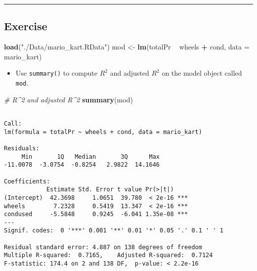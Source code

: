 \documentclass[]{book}
\newenvironment{Shaded}{\begin{snugshade}}{\end{snugshade}}
\newcommand{\KeywordTok}[1]{\textcolor[rgb]{0.13,0.29,0.53}{\textbf{#1}}}
\newcommand{\DataTypeTok}[1]{\textcolor[rgb]{0.13,0.29,0.53}{#1}}
\newcommand{\StringTok}[1]{\textcolor[rgb]{0.31,0.60,0.02}{#1}}
\newcommand{\CommentTok}[1]{\textcolor[rgb]{0.56,0.35,0.01}{\textit{#1}}}
\newcommand{\OperatorTok}[1]{\textcolor[rgb]{0.81,0.36,0.00}{\textbf{#1}}}
\newcommand{\NormalTok}[1]{#1}
\providecommand{\tightlist}{%
  \setlength{\itemsep}{0pt}\setlength{\parskip}{0pt}}
\begin{document}
\begin{center}\rule{0.5\linewidth}{\linethickness}\end{center}

\subsection*{Exercise}\label{exercise-4}

\begin{Shaded}
\begin{Highlighting}[]
\KeywordTok{load}\NormalTok{(}\StringTok{"./Data/mario_kart.RData"}\NormalTok{)}
\NormalTok{mod <-}\StringTok{ }\KeywordTok{lm}\NormalTok{(totalPr }\OperatorTok{~}\StringTok{ }\NormalTok{wheels }\OperatorTok{+}\StringTok{ }\NormalTok{cond, }\DataTypeTok{data =}\NormalTok{ mario_kart)}
\end{Highlighting}
\end{Shaded}

\begin{itemize}
\tightlist
\item
  Use \texttt{summary()} to compute \(R^2\) and adjusted \(R^2\) on the
  model object called \texttt{mod}.
\end{itemize}

\begin{Shaded}
\begin{Highlighting}[]
\CommentTok{# R^2 and adjusted R^2}
\KeywordTok{summary}\NormalTok{(mod)}
\end{Highlighting}
\end{Shaded}

\begin{verbatim}

Call:
lm(formula = totalPr ~ wheels + cond, data = mario_kart)

Residuals:
     Min       1Q   Median       3Q      Max 
-11.0078  -3.0754  -0.8254   2.9822  14.1646 

Coefficients:
            Estimate Std. Error t value Pr(>|t|)    
(Intercept)  42.3698     1.0651  39.780  < 2e-16 ***
wheels        7.2328     0.5419  13.347  < 2e-16 ***
condused     -5.5848     0.9245  -6.041 1.35e-08 ***
---
Signif. codes:  0 '***' 0.001 '**' 0.01 '*' 0.05 '.' 0.1 ' ' 1

Residual standard error: 4.887 on 138 degrees of freedom
Multiple R-squared:  0.7165,    Adjusted R-squared:  0.7124 
F-statistic: 174.4 on 2 and 138 DF,  p-value: < 2.2e-16
\end{verbatim}
\end{document}
